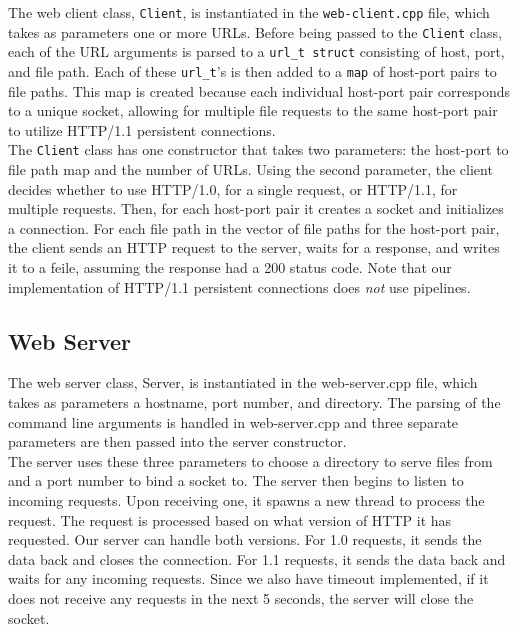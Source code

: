 \documentclass{article}
\begin{document}
The web client class, \texttt{Client}, is instantiated in the \texttt{web-client.cpp} file, which takes as parameters one or more URLs. Before being passed to the \texttt{Client} class, each of the URL arguments is parsed to a \texttt{url\_t struct} consisting of host, port, and file path. Each of these \texttt{url\_t}'s is then added to a \texttt{map} of host-port pairs to file paths. This map is created because each individual host-port pair corresponds to a unique socket, allowing for multiple file requests to the same host-port pair to utilize HTTP/1.1 persistent connections. \\

\noindent
The \texttt{Client} class has one constructor that takes two parameters: the host-port to file path map and the number of URLs. Using the second parameter, the client decides whether to use HTTP/1.0, for a single request, or HTTP/1.1, for multiple requests. Then, for each host-port pair it creates a socket and initializes a connection. For each file path in the vector of file paths for the host-port pair, the client sends an HTTP request to the server, waits for a response, and writes it to a feile, assuming the response had a 200 status code. Note that our implementation of HTTP/1.1 persistent connections does \textit{not} use pipelines.

\subsection{Web Server}

The web server class, Server, is instantiated in the web-server.cpp file, which takes as parameters a hostname, port number, and directory. The parsing of the command line arguments is handled in web-server.cpp and three separate parameters are then passed into the server constructor. \\

\noindent
The server uses these three parameters to choose a directory to serve files from and a port number to bind a socket to. The server then begins to listen to incoming requests. Upon receiving one, it spawns a new thread to process the request. The request is processed based on what version of HTTP it has requested. Our server can handle both versions. For 1.0 requests, it sends the data back and closes the connection. For 1.1 requests, it sends the data back and waits for any incoming requests. Since we also have timeout implemented, if it does not receive any requests in the next 5 seconds, the server will close the socket.
\end{document}
